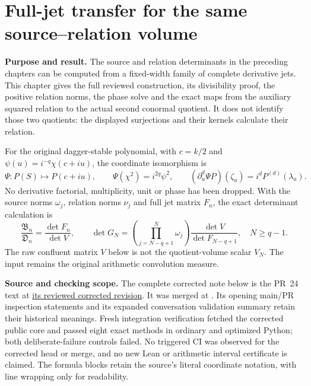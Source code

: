 \section{Full-jet transfer for the same source--relation volume}
\label{sec:confluent-source-transfer}

\textbf{Purpose and result.}
The source and relation determinants in the preceding chapters can be
computed from a fixed-width family of complete derivative jets. This
chapter gives the full reviewed construction, its divisibility proof,
the positive relation norms, the phase solve and the exact maps from the
auxiliary squared relation to the actual second conormal quotient.
It does not identify those two quotients: the displayed surjections and
their kernels calculate their relation.

For the original dagger-stable polynomial, with $c=k/2$ and
$\psi(u)=i^{-q}\chi(c+iu)$, the coordinate isomorphism is
\[
\Psi:P(S)\longmapsto P(c+iu),\qquad
\Psi(\chi^2)=i^{2q}\psi^2,\qquad
(\partial_u^d\Psi P)(\zeta_a)=i^dP^{(d)}(\lambda_a).
\]
No derivative factorial, multiplicity, unit or phase has been dropped.
With the source norms $\omega_j$, relation norms $\nu_j$ and full jet
matrix $F_n$, the exact determinant calculation is
\[
\frac{\mathfrak B_n}{\mathfrak D_n}
=\frac{\det F_n}{\det V},\qquad
\det G_N=\left(\prod_{j=N-q+1}^{N}\omega_j\right)
\frac{\det V}{\det F_{N-q+1}},\quad N\ge q-1.
\]
The raw confluent matrix $V$ below is not the quotient-volume scalar $V_N$.
The input remains the original arithmetic convolution measure.

\textbf{Source and checking scope.}
The complete corrected note below is the PR~24 text at
\href{https://github.com/KokunoYumeto/zeta-function-research-reader/tree/b8d0e04e06854c2e80b288041889659ab2267ebe/workbenches/tau-confluent-transfer}{its reviewed corrected revision}.
It was merged at .
Its opening main/PR inspection statements and its expanded conversation
validation summary retain their historical meanings. Fresh integration
verification fetched the corrected public core and passed eight exact
methods in ordinary and optimized Python; both deliberate-failure
controls failed. No triggered CI was observed for the corrected head or
merge, and no new Lean or arithmetic interval certificate is claimed.
The formula blocks retain the source's literal coordinate notation,
with line wrapping only for readability.

\begingroup
\setlength{\emergencystretch}{3em}
\providecommand{\tightlist}{\setlength{\itemsep}{0pt}\setlength{\parskip}{0pt}}
